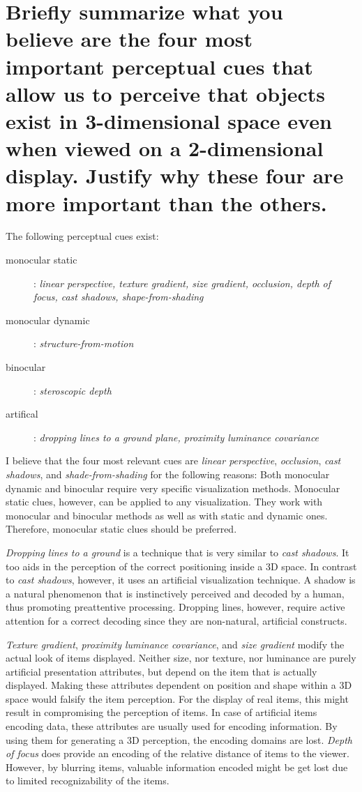 \section{Briefly summarize what you believe are the four most important perceptual
cues that allow us to perceive that objects exist in 3-dimensional space even when
viewed on a 2-dimensional display. Justify why these four are more important than the
others.}

The following perceptual cues exist:
\begin{description}
	\item[monocular static]:
				\emph{linear perspective, texture gradient, size gradient, occlusion, depth of focus, cast shadows, shape-from-shading}
  \item[monocular dynamic]:
  			\emph{structure-from-motion}
	\item[binocular]:
				\emph{steroscopic depth}
	\item[artifical]:
				\emph{dropping lines to a ground plane, proximity luminance covariance}
\end{description}
I believe that the four most relevant cues are \emph{linear perspective}, \emph{occlusion}, \emph{cast shadows}, and \emph{shade-from-shading} for the following reasons: Both monocular dynamic and binocular require very specific visualization methods. Monocular static clues, however, can be applied to any visualization. They work with monocular and binocular methods as well as with static and dynamic ones. Therefore, monocular static clues should be preferred.

\emph{Dropping lines to a ground} is a technique that is very similar to \emph{cast shadows}. It too aids in the perception of the correct positioning inside a 3D space. In contrast to \emph{cast shadows}, however, it uses an artificial visualization technique. A shadow is a natural phenomenon that is instinctively perceived and decoded by a human, thus promoting preattentive processing. Dropping lines, however, require active attention for a correct decoding since they are non-natural, artificial constructs.

\emph{Texture gradient}, \emph{proximity luminance covariance}, and \emph{size gradient} modify the actual look of items displayed. Neither size, nor texture, nor luminance are purely artificial presentation attributes, but depend on the item that is actually displayed. Making these attributes dependent on position and shape within a 3D space would falsify the item perception. For the display of real items, this might result in compromising the perception of items. In case of artificial items encoding data, these attributes are usually used for encoding information. By using them for generating a 3D perception, the encoding domains are lost. \emph{Depth of focus} does provide an encoding of the relative distance of items to the viewer. However, by blurring items, valuable information encoded might be get lost due to limited recognizability of the items.

